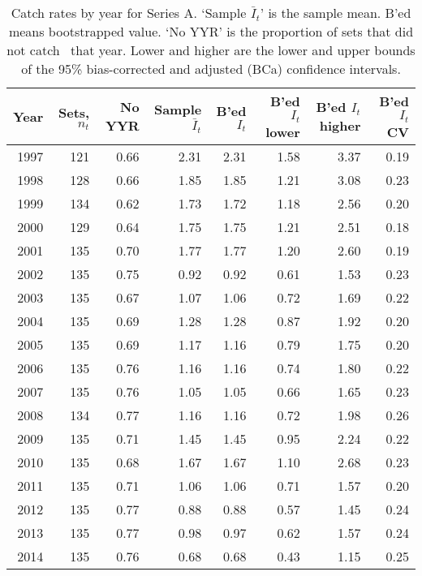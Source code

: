 \begin{table}[tp]
\centering
\caption{Catch rates by year for Series A.
     `Sample $\bar{I}_t$' is the sample mean. B'ed means bootstrapped 
     value. `No YYR' is the proportion of sets that did not catch \spName~that
     year. Lower and higher are the 
     lower and upper bounds of the 95\% bias-corrected and adjusted (BCa)
     confidence intervals.} 
\label{tab:bcaKeepSerA}
\begin{tabular}{rrrrrrrr}
  \hline
Year & Sets, $n_t$ & No YYR & Sample $\bar{I}_t$ & B'ed $I_t$ & B'ed $I_t$ lower & B'ed $I_t$ higher & B'ed $I_t$ CV \\ 
  \hline
1997 & 121 & 0.66 & 2.31 & 2.31 & 1.58 & 3.37 & 0.19 \\ 
  1998 & 128 & 0.66 & 1.85 & 1.85 & 1.21 & 3.08 & 0.23 \\ 
  1999 & 134 & 0.62 & 1.73 & 1.72 & 1.18 & 2.56 & 0.20 \\ 
  2000 & 129 & 0.64 & 1.75 & 1.75 & 1.21 & 2.51 & 0.18 \\ 
  2001 & 135 & 0.70 & 1.77 & 1.77 & 1.20 & 2.60 & 0.19 \\ 
  2002 & 135 & 0.75 & 0.92 & 0.92 & 0.61 & 1.53 & 0.23 \\ 
  2003 & 135 & 0.67 & 1.07 & 1.06 & 0.72 & 1.69 & 0.22 \\ 
  2004 & 135 & 0.69 & 1.28 & 1.28 & 0.87 & 1.92 & 0.20 \\ 
  2005 & 135 & 0.69 & 1.17 & 1.16 & 0.79 & 1.75 & 0.20 \\ 
  2006 & 135 & 0.76 & 1.16 & 1.16 & 0.74 & 1.80 & 0.22 \\ 
  2007 & 135 & 0.76 & 1.05 & 1.05 & 0.66 & 1.65 & 0.23 \\ 
  2008 & 134 & 0.77 & 1.16 & 1.16 & 0.72 & 1.98 & 0.26 \\ 
  2009 & 135 & 0.71 & 1.45 & 1.45 & 0.95 & 2.24 & 0.22 \\ 
  2010 & 135 & 0.68 & 1.67 & 1.67 & 1.10 & 2.68 & 0.23 \\ 
  2011 & 135 & 0.71 & 1.06 & 1.06 & 0.71 & 1.57 & 0.20 \\ 
  2012 & 135 & 0.77 & 0.88 & 0.88 & 0.57 & 1.45 & 0.24 \\ 
  2013 & 135 & 0.77 & 0.98 & 0.97 & 0.62 & 1.57 & 0.24 \\ 
  2014 & 135 & 0.76 & 0.68 & 0.68 & 0.43 & 1.15 & 0.25 \\ 
   \hline
\end{tabular}
\end{table}%
